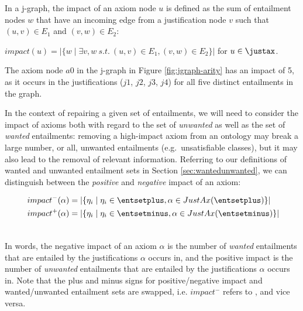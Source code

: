 In a j-graph, the impact of an axiom node $u$ is defined as the sum of entailment nodes $w$ that  have an incoming edge from a justification node $v$ such that $(u, v) \in E_{1}$ and $(v, w) \in E_{2}$:
\begin{defn}[Impact]
$impact(u) =  \left| \lbrace w \mid  \exists v, w ~ s.t. ~ (u, v) \in E_{1}, (v, w) \in E_{2}\rbrace \right|$ for $u \in \justax$.
\end{defn}
The axiom node $a0$ in the j-graph in Figure \ref{fig:jgraph-arity} has an impact of 5, as it occurs in the justifications ($j1$, $j2$, $j3$, $j4$) for all five distinct entailments in the graph.

In the context of repairing a given set of entailments, we will need to consider the impact of axioms both with regard to the set of \emph{unwanted} as well as the set of \emph{wanted} entailments: removing a high-impact axiom from an ontology may break a large number, or all, unwanted entailments (e.g.\ unsatisfiable classes), but it may also lead to the removal of relevant information. Referring to our definitions of wanted and unwanted entailment sets in Section \ref{sec:wantedunwanted}, we can distinguish between the \emph{positive} and \emph{negative} impact of an axiom:
\begin{defn}
\begin{align*}
impact^{-}(\alpha) &= \left| \{\eta_{i} \mid \eta_{i} \in \entsetplus, \alpha \in JustAx(\entsetplus)\}\right| \\\
impact^{+}(\alpha) &= \left| \{\eta_{i} \mid \eta_{i} \in \entsetminus, \alpha \in JustAx(\entsetminus)\} \right| \\\
\end{align*}
\end{defn}	
In words, the negative impact of an axiom $\alpha$ is the number of \emph{wanted} entailments that are entailed by the justifications $\alpha$ occurs in, and the positive impact is the number of \emph{unwanted} entailments that are entailed by the justifications $\alpha$ occurs in. Note that the plus and minus signs for positive/negative impact and wanted/unwanted entailment sets are swapped, i.e. $impact^{-}$ refers to \entsetplus, and vice versa.

